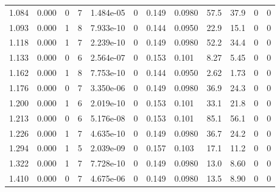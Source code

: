 \documentclass[preview]{standalone}
\begin{document}
{{\begin{tabular}{L{1.2cm}C{1.2cm} C{0.3cm}C{0.5cm} C{1.4cm}C{1.4cm} C{1.4cm}C{1.4cm} C{1.6cm}C{1.6cm} C{1.6cm}C{1.6cm}}
  1.084  &  0.000  & 0     &  7 &  1.484e-05  & 0  &  0.149&   0.0980& 57.5 & 37.9   &  0 & 0  \\ 
  1.093  &  0.000  & 1     &  8 &  7.933e-10  & 0  &  0.144&   0.0950& 22.9 & 15.1   &  0 & 0  \\ 
  1.118  &  0.000  & 1     &  7 &  2.239e-10  & 0  &  0.149&   0.0980& 52.2 & 34.4   &  0 & 0  \\ 
  1.133  &  0.000  & 0     &  6 &  2.564e-07  & 0  &  0.153&   0.101& 8.27 & 5.45   &  0 & 0  \\ 
  1.162  &  0.000  & 1     &  8 &  7.753e-10  & 0  &  0.144&   0.0950& 2.62 & 1.73   &  0 & 0  \\ 
  1.176  &  0.000  & 0     &  7 &  3.350e-06  & 0  &  0.149&   0.0980& 36.9 & 24.3   &  0 & 0  \\ 
  1.200  &  0.000  & 1     &  6 &  2.019e-10  & 0  &  0.153&   0.101& 33.1 & 21.8   &  0 & 0  \\ 
  1.213  &  0.000  & 0     &  6 &  5.176e-08  & 0  &  0.153&   0.101& 85.1 & 56.1   &  0 & 0  \\ 
  1.226  &  0.000  & 1     &  7 &  4.635e-10  & 0  &  0.149&   0.0980& 36.7 & 24.2   &  0 & 0  \\ 
  1.294  &  0.000  & 1     &  5 &  2.039e-09  & 0  &  0.157&   0.103& 17.1 & 11.2   &  0 & 0  \\ 
  1.322  &  0.000  & 1     &  7 &  7.728e-10  & 0  &  0.149&   0.0980& 13.0 & 8.60   &  0 & 0  \\ 
  1.410  &  0.000  & 0     &  7 &  4.675e-06  & 0  &  0.149&   0.0980& 13.5 & 8.90   &  0 & 0  \\ 
\hline 
\end{tabular} 

}}
\end{document}
